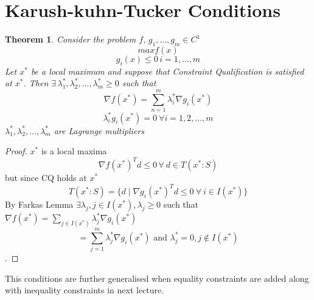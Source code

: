 \documentclass[twoside]{article}
\newcounter{lecnum}
\newtheorem{theorem}{Theorem}[lecnum]
\begin{document}
\section{Karush-kuhn-Tucker Conditions}
\begin{theorem}
Consider the problem $f,\,g_1,...,g_m \in C^{1}$ 
$$max f(x) $$
$$ g_i(x) \leq 0 \, i=1,...,m $$
Let $x^*$ be a local maximum and suppose that Constraint Qualification is satisfied at $x^*$. Then $ \exists \, \lambda_1^*,\lambda_2^*,...,\lambda_m^* \geq 0 $ such that \begin{equation}
\nabla f(x^*) = \sum_{n=1}^{m} \lambda_i^* \nabla g_i(x^*)
\end{equation}
\begin{equation}
\lambda_i^*g_i(x^*) = 0 \ \forall i = 1,2,...,m 
\end{equation}
 $  \lambda_1^*,\lambda_2^*,...,\lambda_m^* $ are Lagrange multipliers
\end{theorem}
\begin{proof}
$x^* $ is a local maxima\\
$$\nabla f(x^*)^{T}d \leq 0\, \forall \  d\in T(x^*:S)$$
but since CQ holds at $x^*$
$$T(x^*:S) = \{ d \mid \nabla g_i(x^*)^{T}d \leq 0\  \forall\  i \in I(x^*)\}$$
By Farkas Lemma $\exists \lambda_j, j \in I(x^*),\lambda_j \geq 0 $ such that $\nabla f(x^*) = \sum_{j\in I(x^*)} \lambda_j^* \nabla g_i(x^*)$\\
$$ =\sum_{j=1}^m \lambda_j^* \nabla g_i(x^*)\text{ and }\lambda_j^* = 0 , j\notin I(x^*)$$.
\end{proof}

This conditions are further generalised when equality constraints are added along with inequality constraints in next lecture.
\end{document}
